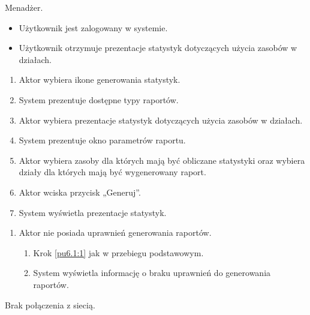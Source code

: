 Menadżer.

\begin{itemize}
\item Użytkownik jest zalogowany w systemie.
\end{itemize}

\begin{itemize}
\item Użytkownik otrzymuje prezentacje statystyk dotyczących użycia zasobów w działach.
\end{itemize}

\begin{enumerate}
	\item \label{pu7.2.2:1} Aktor wybiera ikone generowania statystyk.
	\item System prezentuje dostępne typy raportów.
	\item \label{pu7.2.2:2} Aktor wybiera prezentacje statystyk dotyczących użycia zasobów w działach.
	\item System prezentuje okno parametrów raportu.
	\item Aktor wybiera zasoby dla których mają być obliczane statystyki oraz wybiera działy dla których mają być wygenerowany raport.
	\item Aktor wciska przycisk „Generuj”.
	\item System wyświetla prezentacje statystyk.
\end{enumerate}

\begin{enumerate}
	\item Aktor nie posiada uprawnień generowania raportów.
	\begin{enumerate}[label*=\arabic*.]
		\item Krok \ref{pu6.1:1} jak w przebiegu podstawowym.
		\item System wyświetla informację o braku uprawnień do generowania raportów.
	\end{enumerate}
\end{enumerate}

Brak połączenia z siecią.


